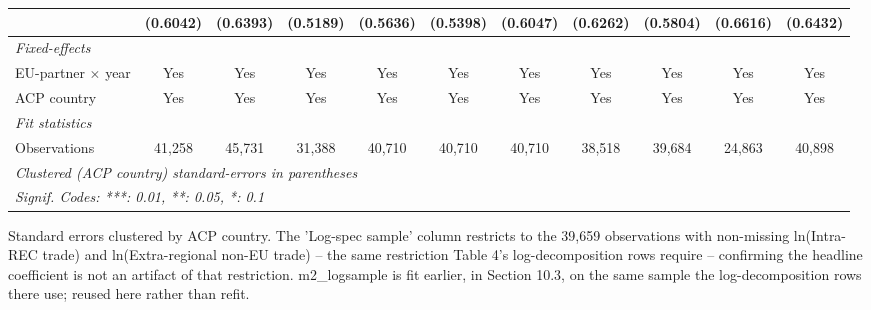 \begin{tabular}{lcccccccccc}
                             & (0.6042)       & (0.6393)       & (0.5189)       & (0.5636)       & (0.5398)       & (0.6047)       & (0.6262)       & (0.5804)       & (0.6616)       & (0.6432)\\   
   \midrule
   \emph{Fixed-effects}\\
   EU-partner $\times$ year  & Yes            & Yes            & Yes            & Yes            & Yes            & Yes            & Yes            & Yes            & Yes            & Yes\\  
   ACP country               & Yes            & Yes            & Yes            & Yes            & Yes            & Yes            & Yes            & Yes            & Yes            & Yes\\  
   \midrule
   \emph{Fit statistics}\\
   Observations              & 41,258         & 45,731         & 31,388         & 40,710         & 40,710         & 40,710         & 38,518         & 39,684         & 24,863         & 40,898\\  
   \midrule \midrule
   \multicolumn{11}{l}{\emph{Clustered (ACP country) standard-errors in parentheses}}\\
   \multicolumn{11}{l}{\emph{Signif. Codes: ***: 0.01, **: 0.05, *: 0.1}}\\
\end{tabular}
 
\par \raggedright 
Standard errors clustered by ACP country. The 'Log-spec sample' column restricts to the 39,659 observations with non-missing ln(Intra-REC trade) and ln(Extra-regional non-EU trade) -- the same restriction Table 4's log-decomposition rows require -- confirming the headline coefficient is not an artifact of that restriction. m2\_logsample is fit earlier, in Section 10.3, on the same sample the log-decomposition rows there use; reused here rather than refit.
\par\endgroup


